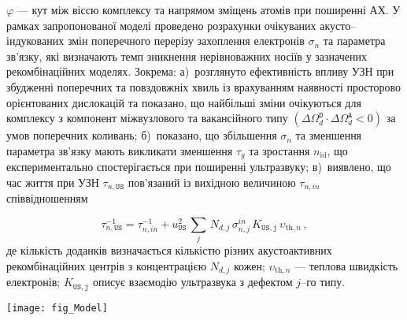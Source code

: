 $\varphi$ --- кут між віссю комплексу та напрямом зміщень атомів при поширенні АХ.
У рамках запропонованої моделі проведено розрахунки очікуваних акусто--індукованих змін поперечного перерізу захоплення електронів $\sigma_{n}$ та параметра зв'язку,
які визначають темп зникнення нерівноважних носіїв
у зазначених рекомбінаційних моделях.
Зокрема:
а)~розглянуто ефективність впливу УЗН при збудженні поперечних та повздовжніх хвиль із врахуванням наявності просторово орієнтованих дислокацій та показано, що найбільші зміни очікуються для
   комплексу з компонент міжвузлового та вакансійного типу $(\Delta\Omega_d^\mathtt{D}\cdot\Delta\Omega_d^\mathtt{A}<0)$
 за умов поперечних коливань;
б)~показано, що збільшення $\sigma_{n}$ та зменшення параметра зв'язку мають викликати зменшення $\tau_g$ та зростання $n_\mathrm{id}$, що експериментально спостерігається при поширенні ультразвуку;
в)~виявлено, що час життя при УЗН $\tau_{n,\mathtt{US}}$ пов'язаний із вихідною величиною $\tau_{n,in}$ співвідношенням



\begin{equation}
\label{eqEpsSigUSA}
\tau_{n,\mathtt{US}}^{-1}=
\tau_{n,in}^{-1}+u_{\mathtt{US}}^2\,\sum_j\,N_{d,j}\,\sigma_{n,j}^{in}\,K_\mathtt{US,j}\,\upsilon_{\mathrm{th},n}\,,
\end{equation}
де
кількість доданків визначається кількістю різних
акустоактивних рекомбінаційних центрів 
з концентрацією $N_{d,j}$ кожен;
$\upsilon_{\mathrm{th},n}$ --- теплова швидкість електронів;
$K_\mathtt{US,j}$ описує взаємодію ультразвука з дефектом $j$--го типу.



\begin{SCfigure}[1.0]
\texttt{[image: fig\_Model]}
\caption{\label{fig_Model}
\FigModelCaption
}
\end{SCfigure}



